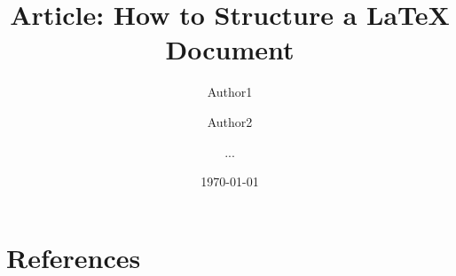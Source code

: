 \documentclass[11pt,twocolumn,a4paper]{article}
\begin{document}
\title{Article: How to Structure a LaTeX Document}
\author{Author1 \and Author2 \and ...}
\date{\today}

\maketitle

\section*{References}
\end{document}
